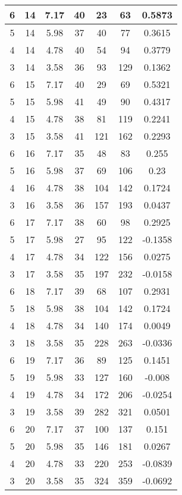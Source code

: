 \documentclass[letterpaper, 12pt]{article}
\begin{document}
\begin{longtable}{|c|c|c|c|c|c|c|}
\hline
6 & 14 & 7.17 & 40 & 23 & 63 & 0.5873 \\
\hline
5 & 14 & 5.98 & 37 & 40 & 77 & 0.3615 \\
\hline
4 & 14 & 4.78 & 40 & 54 & 94 & 0.3779 \\
\hline
3 & 14 & 3.58 & 36 & 93 & 129 & 0.1362 \\
\hline
6 & 15 & 7.17 & 40 & 29 & 69 & 0.5321 \\
\hline
5 & 15 & 5.98 & 41 & 49 & 90 & 0.4317 \\
\hline
4 & 15 & 4.78 & 38 & 81 & 119 & 0.2241 \\
\hline
3 & 15 & 3.58 & 41 & 121 & 162 & 0.2293 \\
\hline
6 & 16 & 7.17 & 35 & 48 & 83 & 0.255 \\
\hline
5 & 16 & 5.98 & 37 & 69 & 106 & 0.23 \\
\hline
4 & 16 & 4.78 & 38 & 104 & 142 & 0.1724 \\
\hline
3 & 16 & 3.58 & 36 & 157 & 193 & 0.0437 \\
\hline
6 & 17 & 7.17 & 38 & 60 & 98 & 0.2925 \\
\hline
5 & 17 & 5.98 & 27 & 95 & 122 & -0.1358 \\
\hline
4 & 17 & 4.78 & 34 & 122 & 156 & 0.0275 \\
\hline
3 & 17 & 3.58 & 35 & 197 & 232 & -0.0158 \\
\hline
6 & 18 & 7.17 & 39 & 68 & 107 & 0.2931 \\
\hline
5 & 18 & 5.98 & 38 & 104 & 142 & 0.1724 \\
\hline
4 & 18 & 4.78 & 34 & 140 & 174 & 0.0049 \\
\hline
3 & 18 & 3.58 & 35 & 228 & 263 & -0.0336 \\
\hline
6 & 19 & 7.17 & 36 & 89 & 125 & 0.1451 \\
\hline
5 & 19 & 5.98 & 33 & 127 & 160 & -0.008 \\
\hline
4 & 19 & 4.78 & 34 & 172 & 206 & -0.0254 \\
\hline
3 & 19 & 3.58 & 39 & 282 & 321 & 0.0501 \\
\hline
6 & 20 & 7.17 & 37 & 100 & 137 & 0.151 \\
\hline
5 & 20 & 5.98 & 35 & 146 & 181 & 0.0267 \\
\hline
4 & 20 & 4.78 & 33 & 220 & 253 & -0.0839 \\
\hline
3 & 20 & 3.58 & 35 & 324 & 359 & -0.0692 \\
\hline
\end{longtable}
\end{document}
